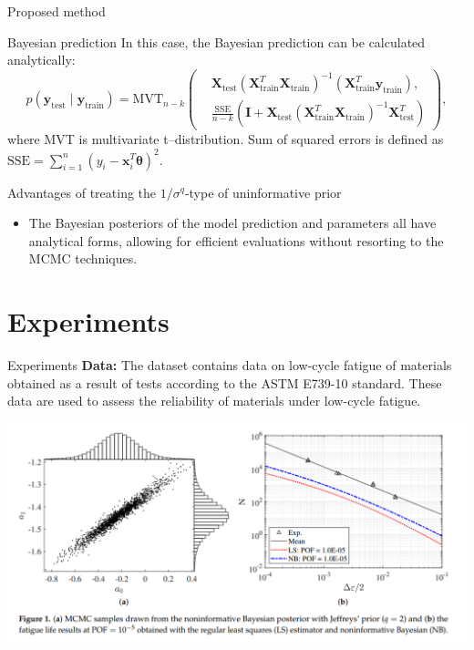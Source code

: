 \documentclass{beamer}
\begin{document}
\begin{frame}{Proposed method}
\begin{block}{Bayesian prediction}
    In this case, the Bayesian prediction can be calculated analytically:
$$
p(\mathbf{y}_{\text{test}} \mid \mathbf{y}_{\text{train}}) = \mathrm{MVT}_{n-k}\left(
\begin{aligned}
&\mathbf{X}_{\text{test}}(\mathbf{X}_{\text{train}}^T \mathbf{X}_{\text{train}})^{-1}(\mathbf{X}_{\text{train}}^T \mathbf{y}_{\text{train}}), \\
&\frac{\mathrm{SSE}}{n-k}\left(\mathbf{I}+\mathbf{X}_{\text{test}}(\mathbf{X}_{\text{train}}^T \mathbf{X}_{\text{train}})^{-1}\mathbf{X}_{\text{test}}^T\right)
\end{aligned}
\right),
$$
where MVT is multivariate t–distribution. Sum of squared errors is defined as $\mathrm{SSE} = \sum_{i=1}^n (y_i - \mathbf{x}_i^T \boldsymbol{\theta})^2$.
\end{block}
\begin{block}{Advantages of treating the $1/\sigma^q$-type of uninformative prior}
\begin{itemize}
\item The Bayesian posteriors of the model prediction and parameters all have analytical forms, allowing for efficient evaluations without resorting to the MCMC techniques.
\end{itemize}
\end{block}

\end{frame}

\section{Experiments}
\begin{frame}{Experiments}
    \textbf{Data:} The dataset contains data on low-cycle fatigue of materials obtained as a result of tests according to the ASTM E739-10 standard. These data are used to assess the reliability of materials under low-cycle fatigue.
    \vspace{-0.1cm}
       \begin{center}
        \includegraphics[width=1\textwidth]{figs/exp1.png}
        \end{center}
\end{frame}
\end{document}
